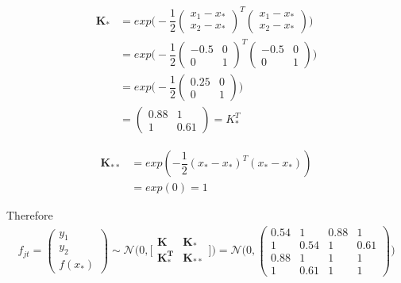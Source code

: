 \documentclass[11pt]{article}
\begin{document}
\begin{align*}
	\boldsymbol{K_*} &= exp\big(-\dfrac{1}{2}
	\begin{pmatrix}
		x_1 - x_* \\
		x_2 - x_*
	\end{pmatrix}^T 
	\begin{pmatrix}
		x_1 - x_* \\
		x_2 - x_*
	\end{pmatrix}
	\big)\\	
	&= exp\big(-\dfrac{1}{2}
	\begin{pmatrix}
		-0.5 & 0\\
		0 & 1
	\end{pmatrix}^T 
	\begin{pmatrix}
		-0.5 & 0\\
		0 & 1
	\end{pmatrix}
	\big)\\	
	&= exp\big(-\dfrac{1}{2}
	\begin{pmatrix}
		0.25 & 0 \\
		0 & 1
	\end{pmatrix}
	\big)\\	
	&=
	\begin{pmatrix}
		0.88 & 1 \\
		1 & 0.61
	\end{pmatrix} = K^T_*
\end{align*}

\begin{align*}
	\boldsymbol{K_{**}} &= exp(-\dfrac{1}{2} (x_* - x_*)^T (x_* - x_*)) \\
		   &= exp(0) = 1
\end{align*}

Therefore
\begin{align*}
	f_{jt} =
	\begin{pmatrix}
		y_1\\
		y_2\\
		f(x_*)
	\end{pmatrix}
	\sim \mathcal N \Big(0, \Big[
	\begin{matrix}
		\boldsymbol{K} & \boldsymbol{K_*} \\
		\boldsymbol{K_*^T} & \boldsymbol{K_{**}}
	\end{matrix}
	\Big]\Big)
	= \mathcal N \Big(0,
	\begin{pmatrix}
		0.54 & 1 & 0.88 & 1\\
		1 & 0.54 & 1 & 0.61\\		
		0.88 & 1 & 1 & 1\\
		1 & 0.61 & 1 & 1
	\end{pmatrix}
	\Big)
\end{align*}
\end{document}
